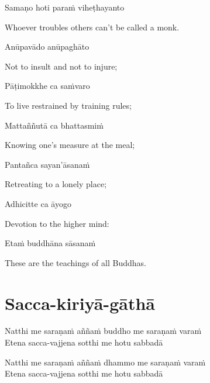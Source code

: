 Samaṇo hoti paraṁ viheṭhayanto

\begin{cprenglish}
  Whoever troubles others can't be called a monk.
\end{cprenglish}

Anūpavādo anūpaghāto

\begin{cprenglish}
  Not to insult and not to injure;
\end{cprenglish}

Pāṭimokkhe ca saṁvaro

\begin{cprenglish}
  To live restrained by training rules;
\end{cprenglish}

Mattaññutā ca bhattasmiṁ

\begin{cprenglish}
  Knowing one's measure at the meal;
\end{cprenglish}

Pantañca sayan'āsanaṁ

\begin{cprenglish}
  Retreating to a lonely place;
\end{cprenglish}

Adhicitte ca āyogo

\begin{cprenglish}
  Devotion to the higher mind:
\end{cprenglish}

Etaṁ buddhāna sāsanaṁ

\begin{cprenglish}
  These are the teachings of all Buddhas. 
\end{cprenglish}

\section{Sacca-kiriyā-gāthā}

\begin{leader}
\end{leader}


Natthi me saraṇaṁ aññaṁ buddho me saraṇaṁ varaṁ\\
Etena sacca-vajjena sotthi me hotu sabbadā

Natthi me saraṇaṁ aññaṁ dhammo me saraṇaṁ varaṁ\\
Etena sacca-vajjena sotthi me hotu sabbadā

